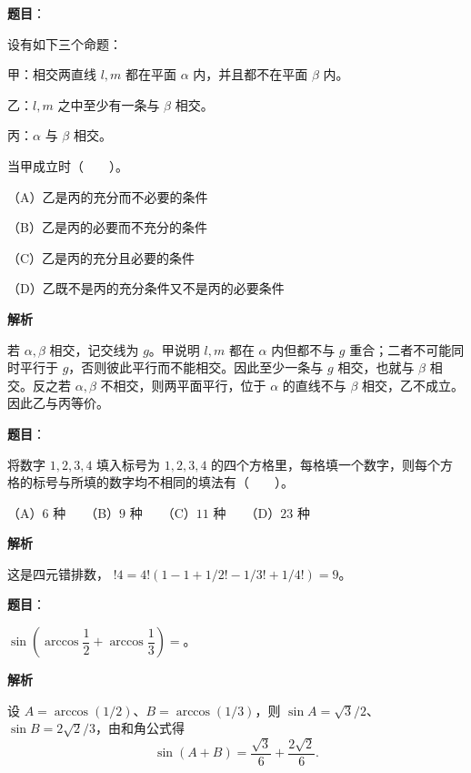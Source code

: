 \begin{answer}

\textbf{题目}：

设有如下三个命题：

甲：相交两直线 $l,m$ 都在平面 $\alpha$ 内，并且都不在平面 $\beta$ 内。

乙：$l,m$ 之中至少有一条与 $\beta$ 相交。

丙：$\alpha$ 与 $\beta$ 相交。

当甲成立时\mbox{（　　）}。

（A）乙是丙的充分而不必要的条件

（B）乙是丙的必要而不充分的条件

（C）乙是丙的充分且必要的条件

（D）乙既不是丙的充分条件又不是丙的必要条件

\textbf{解析}

若 $\alpha,\beta$ 相交，记交线为 $g$。甲说明 $l,m$ 都在 $\alpha$ 内但都不与 $g$ 重合；二者不可能同时平行于 $g$，否则彼此平行而不能相交。因此至少一条与 $g$ 相交，也就与 $\beta$ 相交。反之若 $\alpha,\beta$ 不相交，则两平面平行，位于 $\alpha$ 的直线不与 $\beta$ 相交，乙不成立。因此乙与丙等价。


\end{answer}
\begin{answer}

\textbf{题目}：

将数字 $1,2,3,4$ 填入标号为 $1,2,3,4$ 的四个方格里，每格填一个数字，则每个方格的标号与所填的数字均不相同的填法有\mbox{（　　）}。

（A）$6$ 种　　（B）$9$ 种　　（C）$11$ 种　　（D）$23$ 种

\textbf{解析}

这是四元错排数，
$!4=4!(1-1+1/2!-1/3!+1/4!)=9$。


\end{answer}
\begin{answer}

\textbf{题目}：

$\displaystyle\sin\left(\arccos\dfrac12+\arccos\dfrac13\right)=$\underline{\qquad\qquad}。

\textbf{解析}

 设 $A=\arccos(1/2)$、$B=\arccos(1/3)$，则 $\sin A=\sqrt3/2$、$\sin B=2\sqrt2/3$，由和角公式得
\nopagebreak[4]
\[
\sin(A+B)=\frac{\sqrt3}{6}+\frac{2\sqrt2}{6}.
\]


\end{answer}
